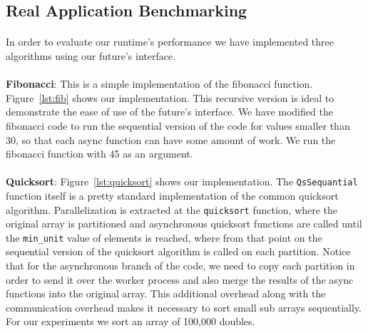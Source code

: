 \subsection{Real Application Benchmarking}
\label{sect:real_app}
\paragraph{}
	In order to evaluate our runtime's performance we have implemented three algorithms using our future's interface.

\paragraph{}
	\textbf{Fibonacci}:  This is a simple implementation of the fibonacci function.  Figure~\ref{lst:fib} shows 
our implementation.  This recursive version is ideal to demonstrate the ease of use of the future's interface.
We have modified the fibonacci code to run the sequential version of the code for values smaller than  30, so that
each async function can have some amount of work.  We run the fibonacci function with 45 as an argument.  

\paragraph{}
	\textbf{Quicksort}:  Figure~\ref{lst:quicksort} shows our implementation.  The \texttt{QsSequantial} 
function itself is a pretty standard
implementation of the common quicksort algorithm.  Parallelization is extracted at the \texttt{quicksort} function, where the 
original array is partitioned and asynchronous quicksort functions are called until the \texttt{min\_unit} value of elements
is reached, where from that point on the sequential version of the quicksort algorithm is called on each partition.
Notice that for the asynchronous branch of the code, we need to copy each partition in order to send it over the worker 
process and also merge the results of the async functions into the original array.  This additional overhead along with 
the communication overhead makes it necessary to sort small sub arrays sequentially.  For our experiments we sort an 
array of 100,000 doubles. 

